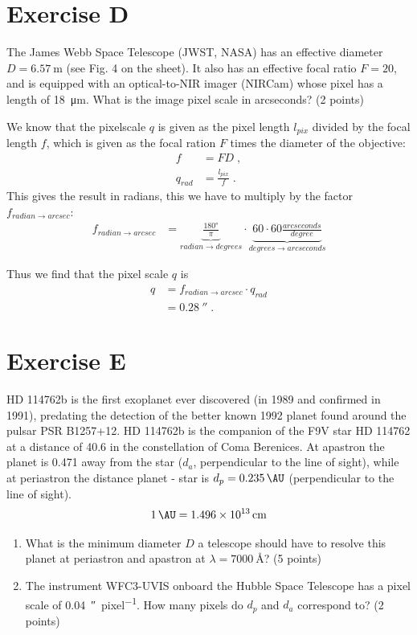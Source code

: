 \documentclass[11pt,a4paper,twoside]{article}
\begin{document}
\section*{Exercise D}
The James Webb Space Telescope (JWST, NASA) has an effective diameter
$D = \SI{6.57}{\meter}$ (see Fig. 4 on the sheet). It also has an effective 
focal ratio $F = 20$, and is equipped with an optical-to-NIR imager (NIRCam) 
whose pixel has a length of \SI{18}{\micro\meter}. What is the image pixel 
scale in arcseconds? (2 points)
\newline

We know that the pixelscale $q$ is given as the pixel length $l_{pix}$ divided 
by the focal length $f$, which is given as the focal ration $F$ times the 
diameter of the objective:
\begin{align}
    f &= FD \;, \\
    q_{rad} &= \frac{l_{pix}}{f} \;.
\end{align}
This gives the result in radians, this we have to multiply by the factor
$f_{radian \rightarrow arcsec}$:
\begin{align}
    f_{radian \rightarrow arcsec} &= 
    \underbrace{\frac{\ang{180}}{\pi}}_{radian \rightarrow degrees} \cdot 
    \underbrace{60 \cdot 60 \frac{\si{arcseconds}}{\si{degree}}}_{
                degrees \rightarrow arcseconds}
\end{align}

Thus we find that the pixel scale $q$ is
\begin{align}
    q &= f_{radian \rightarrow arcsec} \cdot q_{rad} \\
    &= \SI{0.28}{\arcsecond} \;.
\end{align}


\section*{Exercise E}
HD 114762b is the first exoplanet ever discovered (in 1989 and confirmed in
1991), predating the detection of the better known 1992 planet found around the 
pulsar PSR B1257+12. HD 114762b is the companion of the F9V star HD 114762 at 
a distance of \SI{40.6}{\parsec} in the constellation of Coma Berenices.
At apastron the planet is \SI{0.471}{\AU} away from the star ($d_a$, 
perpendicular to the line of sight), while at periastron the distance 
planet - star is $d_p = \SI{0.235}{\AU}$ (perpendicular to the  line of sight).
$$\SI{1}{\AU} = \SI{1.496d13}{\centi\meter}$$

\begin{enumerate}
\item What is the minimum diameter $D$ a telescope should have to resolve this 
planet at periastron and apastron at $\lambda = \SI{7000}{\angstrom}$? 
(5 points)
\item The instrument WFC3-UVIS onboard the Hubble Space Telescope has a pixel 
scale of \SI{0.04}{\arcsecond\per pixel}. How many pixels do $d_p$ and $d_a$ 
correspond to? (2 points)
\end{enumerate}
\end{document}
